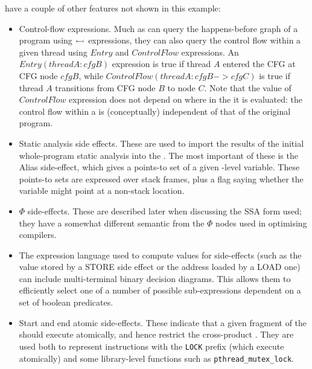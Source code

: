 \STateMachines have a couple of other features not shown in this
example:

\begin{itemize}
\item
  Control-flow expressions.  Much as \StateMachines can query the
  happens-before graph of a program using $\leftarrowtail$
  expressions, they can also query the control flow within a given
  thread using $Entry$ and $ControlFlow$ expressions.  An
  $Entry(threadA:cfgB)$ expression is true if thread $A$ entered the
  CFG at CFG node $cfgB$, while $ControlFlow(threadA:cfgB->cfgC)$ is
  true if thread $A$ transitions from CFG node $B$ to node $C$.  Note
  that the value of $ControlFlow$ expression does not depend on where
  in the \StateMachine it is evaluated: the control flow within a
  \StateMachine is (conceptually) independent of that of the original
  program.
\item
  Static analysis side effects.  These are used to import the results
  of the initial whole-program static analysis into the \StateMachine.
  The most important of these is the Alias side-effect, which gives a
  points-to set of a given \StateMachine-level variable.  These
  points-to sets are expressed over stack frames, plus a flag saying
  whether the variable might point at a non-stack location.
\item
  $\Phi$ side-effects.  These are described later when discussing the
  SSA form used; they have a somewhat different semantic from the
  $\Phi$ nodes used in optimising compilers.
\item
  The expression language used to compute values for side-effects
  (such as the value stored by a STORE side effect or the address
  loaded by a LOAD one) can include multi-terminal binary decision
  diagrams.  This allows
  them to efficiently select one of a number of possible
  sub-expressions dependent on a set of boolean predicates.
\item
  Start and end atomic side-effects.  These indicate that a given
  fragment of the \StateMachine should execute atomically, and hence
  restrict the cross-product \StateMachine.  They are used both to
  represent instructions with the \verb|LOCK| prefix (which execute
  atomically) and some library-level functions such as
  \verb|pthread_mutex_lock|.
\end{itemize}

